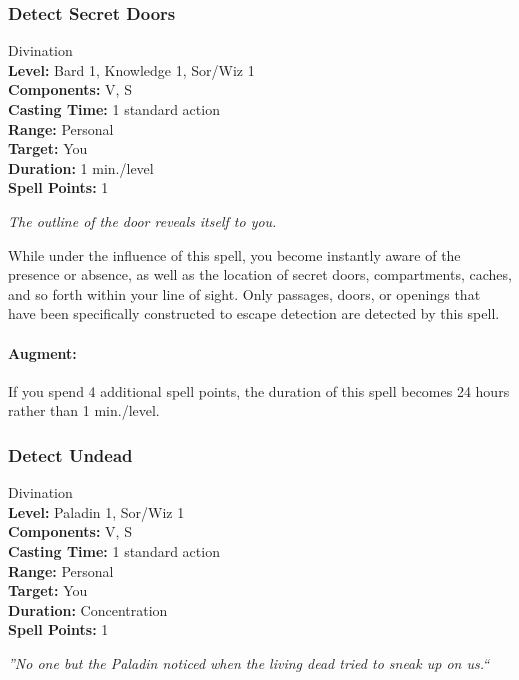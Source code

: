 \subsubsection{Detect Secret Doors}
\label{Spell:DetectSecretDoors}
Divination
\\ \textbf{Level:} Bard 1, Knowledge 1, Sor/Wiz 1
\\ \textbf{Components:} V, S
\\ \textbf{Casting Time:} 1 standard action
\\ \textbf{Range:} Personal
\\ \textbf{Target:} You
\\ \textbf{Duration:} 1 min./level
\\ \textbf{Spell Points:} 1

\emph{The outline of the door reveals itself to you.}

While under the influence of this spell, you become instantly aware of the presence or absence, 
as well as the location of secret doors, compartments, caches, and so forth within your line of sight. 
Only passages, doors, or openings that have been specifically constructed to escape detection are detected by this spell.

\paragraph{Augment:} If you spend 4 additional spell points, the duration of this spell becomes 24 hours rather than 1 min./level.
\subsubsection{Detect Undead}
\label{Spell:DetectUndead}
Divination
\\ \textbf{Level:} Paladin 1, Sor/Wiz 1
\\ \textbf{Components:} V, S
\\ \textbf{Casting Time:} 1 standard action
\\ \textbf{Range:} Personal
\\ \textbf{Target:} You
\\ \textbf{Duration:} Concentration
\\ \textbf{Spell Points:} 1

\emph{''No one but the Paladin noticed when the living dead tried to sneak up on us.``}

